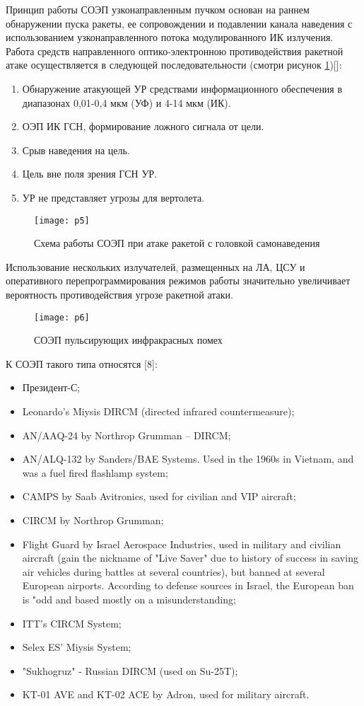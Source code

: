 Принцип работы СОЭП узконаправленным пучком основан на раннем обнаружении пуска ракеты, ее сопровождении и подавлении канала наведения с использованием узконаправленного потока модулированного ИК излучения.  Работа средств направленного оптико-электронною противодействия ракетной атаке осуществляется в следующей последовательности (смотри рисунок \ref{fig:p5})[]:

\begin{enumerate}
	\item Обнаружение атакующей УР средствами информационного обеспечения в диапазонах 0,01-0,4 мкм (УФ) и 4-14 мкм (ИК).
	\item ОЭП ИК ГСН, формирование ложного сигнала от цели. 
	\item Срыв наведения на цель. 
	\item Цель вне поля зрения ГСН УР. 
	\item УР не представляет угрозы для вертолета.	
\end{enumerate}

\begin{figure}[ht]
	\texttt{[image: p5]} 
	\caption{Схема работы СОЭП при атаке ракетой с головкой самонаведения}
	\label{fig:p5}
\end{figure}

Использование нескольких излучателей, размещенных на ЛА, ЦСУ и оперативного перепрограммирования режимов работы значительно увеличивает вероятность противодействия угрозе ракетной атаки.

\begin{figure}[ht]
	\texttt{[image: p6]} 
	\caption{СОЭП пульсирующих инфракрасных помех}
	\label{fig:p6}
\end{figure}

К СОЭП такого типа относятся [8]:
\begin{itemize}
	\item Президент-С;
	\item Leonardo’s Miysis DIRCM (directed infrared countermeasure);
	\item AN/AAQ-24 by Northrop Grumman – DIRCM;
	\item AN/ALQ-132 by Sanders/BAE Systems. Used in the 1960s in Vietnam, and was a fuel fired flashlamp system;
	\item CAMPS by Saab Avitronics, used for civilian and VIP aircraft;
	\item CIRCM by Northrop Grumman;
	\item Flight Guard by Israel Aerospace Industries, used in military and civilian aircraft (gain the nickname of "Live Saver" due to history of success in saving air vehicles during battles at several countries), but banned at several European airports. According to defense sources in Israel, the European ban is "odd and based mostly on a misunderstanding;
	\item ITT's CIRCM System;
	\item Selex ES' Miysis System;
	\item "Sukhogruz" - Russian DIRCM (used on Su-25T);
	\item KT-01 AVE and KT-02 ACE by Adron, used for military aircraft.		
\end{itemize}

